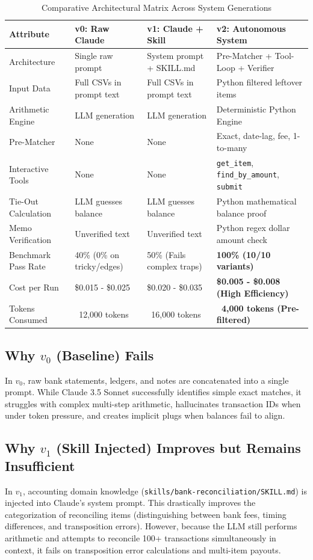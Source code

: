 \documentclass[10pt,a4paper]{article}
\begin{document}
\begin{table}[h]
\centering
\small
\begin{tabular}{@{}llll@{}}
\toprule
\textbf{Attribute} & \textbf{v0: Raw Claude} & \textbf{v1: Claude + Skill} & \textbf{v2: Autonomous System} \\ \midrule
Architecture & Single raw prompt & System prompt + SKILL.md & Pre-Matcher + Tool-Loop + Verifier \\
Input Data & Full CSVs in prompt text & Full CSVs in prompt text & Python filtered leftover items \\
Arithmetic Engine & LLM generation & LLM generation & Deterministic Python Engine \\
Pre-Matcher & None & None & Exact, date-lag, fee, 1-to-many \\
Interactive Tools & None & None & \texttt{get\_item}, \texttt{find\_by\_amount}, \texttt{submit} \\
Tie-Out Calculation & LLM guesses balance & LLM guesses balance & Python mathematical balance proof \\
Memo Verification & Unverified text & Unverified text & Python regex dollar amount check \\
Benchmark Pass Rate & 40\% (0\% on tricky/edges) & 50\% (Fails complex traps) & \textbf{100\% (10/10 variants)} \\
Cost per Run & \$0.015 - \$0.025 & \$0.020 - \$0.035 & \textbf{\$0.005 - \$0.008 (High Efficiency)} \\
Tokens Consumed & ~12,000 tokens & ~16,000 tokens & \textbf{~4,000 tokens (Pre-filtered)} \\ \bottomrule
\end{tabular}
\caption{Comparative Architectural Matrix Across System Generations}
\end{table}

\subsection{Why $v_0$ (Baseline) Fails}
In $v_0$, raw bank statements, ledgers, and notes are concatenated into a single prompt. While Claude 3.5 Sonnet successfully identifies simple exact matches, it struggles with complex multi-step arithmetic, hallucinates transaction IDs when under token pressure, and creates implicit plugs when balances fail to align.

\subsection{Why $v_1$ (Skill Injected) Improves but Remains Insufficient}
In $v_1$, accounting domain knowledge (\texttt{skills/bank-reconciliation/SKILL.md}) is injected into Claude's system prompt. This drastically improves the categorization of reconciling items (distinguishing between bank fees, timing differences, and transposition errors). However, because the LLM still performs arithmetic and attempts to reconcile 100+ transactions simultaneously in context, it fails on transposition error calculations and multi-item payouts.
\end{document}
